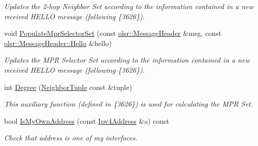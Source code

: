 \begin{DoxyCompactItemize}
\begin{DoxyCompactList}\small\item\em Updates the 2-\/hop Neighbor Set according to the information contained in a new received H\+E\+L\+LO message (following \{3626\}). \end{DoxyCompactList}\item 
void \hyperlink{classns3_1_1olsr_1_1RoutingProtocol_a56bce0e7794315308e10e5fd1343cfaf}{Populate\+Mpr\+Selector\+Set} (const \hyperlink{classns3_1_1olsr_1_1MessageHeader}{olsr\+::\+Message\+Header} \&msg, const \hyperlink{structns3_1_1olsr_1_1MessageHeader_1_1Hello}{olsr\+::\+Message\+Header\+::\+Hello} \&hello)
\begin{DoxyCompactList}\small\item\em Updates the M\+PR Selector Set according to the information contained in a new received H\+E\+L\+LO message (following \{3626\}). \end{DoxyCompactList}\item 
int \hyperlink{classns3_1_1olsr_1_1RoutingProtocol_af4806875b065d6fe5704ce65824dc1a7}{Degree} (\hyperlink{structns3_1_1olsr_1_1NeighborTuple}{Neighbor\+Tuple} const \&tuple)
\begin{DoxyCompactList}\small\item\em This auxiliary function (defined in \{3626\}) is used for calculating the M\+PR Set. \end{DoxyCompactList}\item 
bool \hyperlink{classns3_1_1olsr_1_1RoutingProtocol_a651b14b759452a21133cde6ef0f2f873}{Is\+My\+Own\+Address} (const \hyperlink{classns3_1_1Ipv4Address}{Ipv4\+Address} \&a) const 
\begin{DoxyCompactList}\small\item\em Check that address is one of my interfaces. \end{DoxyCompactList}\end{DoxyCompactItemize}
